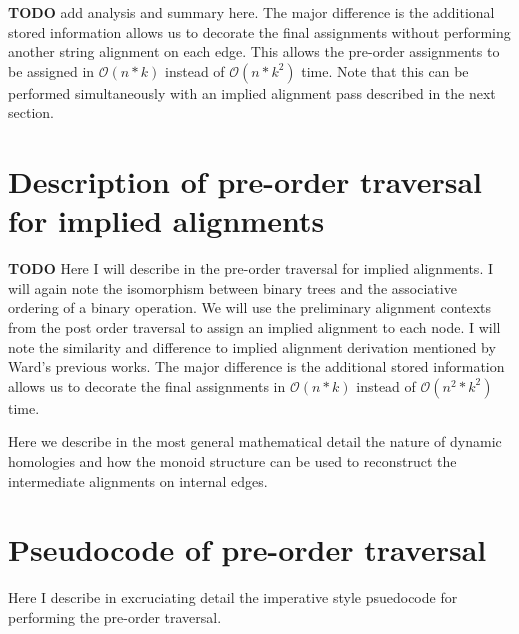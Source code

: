 \documentclass[11pt]{article}
\begin{document}
\textbf{TODO} add analysis and summary here.
The major difference is the additional stored information allows us to decorate the final assignments without performing another string alignment on each edge.
This allows the pre-order assignments to be assigned in $\mathcal{O}(n*k)$ instead of $\mathcal{O}(n*k^2)$ time.
Note that this can be performed simultaneously with an implied alignment pass described in the next section.

\section{Description of pre-order traversal for implied alignments}
\textbf{TODO}
Here I will describe in the pre-order traversal for implied alignments. I will again note the isomorphism between binary trees and the associative ordering of a binary operation. 
We will use the preliminary alignment contexts from the post order traversal to assign an implied alignment to each node. 
I will note the similarity and difference to implied alignment derivation mentioned by Ward's previous works. 
The major difference is the additional stored information allows us to decorate the final assignments in $\mathcal{O}(n*k)$ instead of $\mathcal{O}(n^2*k^2)$ time.

Here we describe in the most general mathematical detail the nature of dynamic homologies and how the monoid structure can be used to reconstruct the intermediate alignments on internal edges.


\section{Pseudocode of pre-order traversal}
Here I describe in excruciating detail the imperative style psuedocode for performing the pre-order traversal.
\end{document}
